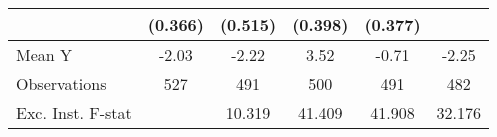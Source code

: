 {\begin{tabular}{l*{5}{c}}
            &     (0.366)         &     (0.515)         &     (0.398)         &     (0.377)         &                     \\
\midrule
Mean Y      &       -2.03         &       -2.22         &        3.52         &       -0.71         &       -2.25         \\
Observations&         527         &         491         &         500         &         491         &         482         \\
Exc. Inst. F-stat&                     &      10.319         &      41.409         &      41.908         &      32.176         \\
\bottomrule
\end{tabular}
}
